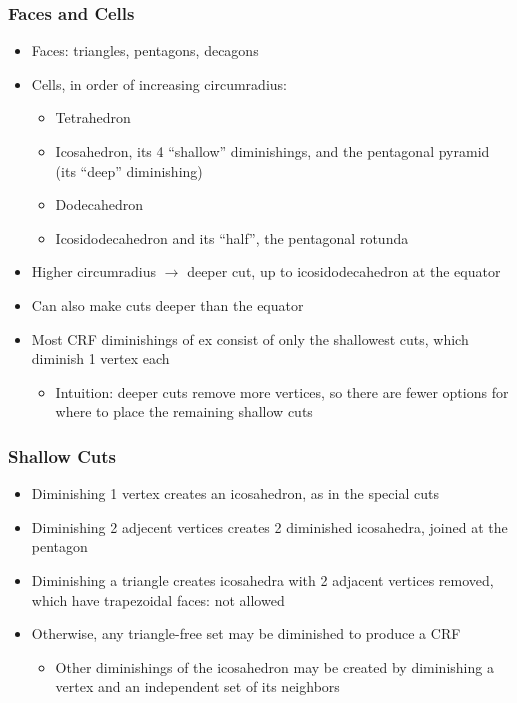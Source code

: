 \documentclass{beamer}
\begin{document}
\begin{frame}
  \frametitle{Faces and Cells}
  \begin{itemize}
  \item
    Faces: triangles, pentagons, decagons
  \item
    Cells, in order of increasing circumradius:
    \begin{itemize}
    \item
      Tetrahedron
    \item
      Icosahedron, its 4 ``shallow'' diminishings, and the pentagonal pyramid (its ``deep'' diminishing)
    \item
      Dodecahedron
    \item
      Icosidodecahedron and its ``half'', the pentagonal rotunda
    \end{itemize}
  \item
    Higher circumradius $\rightarrow$ deeper cut, up to icosidodecahedron at the equator
  \item
    Can also make cuts deeper than the equator
  \item
    Most CRF diminishings of ex consist of only the shallowest cuts,
    which diminish 1 vertex each
    \begin{itemize}
    \item
      Intuition: deeper cuts remove more vertices,
      so there are fewer options for where to place the remaining shallow cuts
    \end{itemize}
  \end{itemize}
\end{frame}
\begin{frame}
  \frametitle{Shallow Cuts}
  \begin{itemize}
  \item
    Diminishing 1 vertex creates an icosahedron, as in the special cuts
  \item
    Diminishing 2 adjecent vertices creates 2 diminished icosahedra,
    joined at the pentagon
  \item
    Diminishing a triangle creates icosahedra with 2 adjacent vertices removed,
    which have trapezoidal faces: not allowed
  \item
    Otherwise, any triangle-free set may be diminished to produce a CRF
    \begin{itemize}
    \item
      Other diminishings of the icosahedron may be created
      by diminishing a vertex and an independent set of its neighbors
    \end{itemize}
  \end{itemize}
\end{frame}
\end{document}
